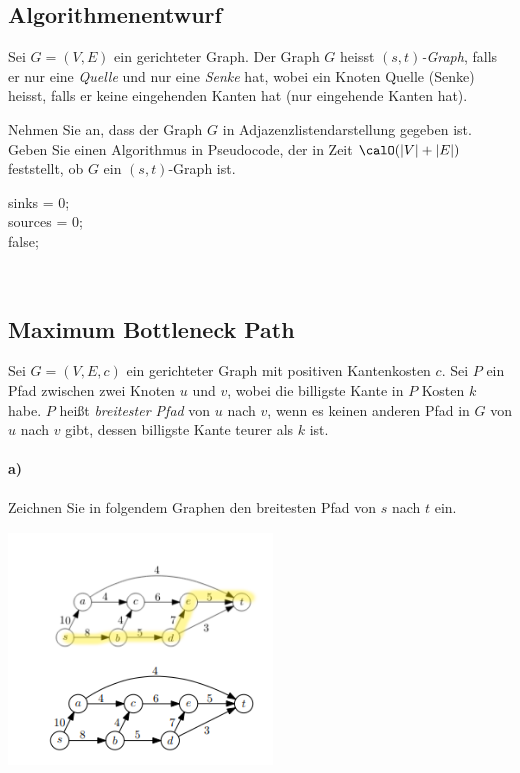 \documentclass[paper=a4, fontsize=11pt]{scrartcl}
\numberwithin{equation}{section}
\numberwithin{figure}{section}
\numberwithin{table}{section}
\begin{document}
\subsection{Algorithmenentwurf}
Sei $G = (V,E)$ ein gerichteter Graph. Der Graph $G$ heisst \emph{$(s,t)$-Graph}, falls er nur eine \emph{Quelle} und nur eine \emph{Senke} hat, wobei ein Knoten Quelle (Senke) heisst, falls er keine eingehenden Kanten hat (nur eingehende Kanten hat).

\medskip\noindent
Nehmen Sie an, dass der Graph $G$ in Adjazenzlistendarstellung gegeben ist.
Geben Sie einen Algorithmus in Pseudocode, der in Zeit $\calO(|V| + |E|)$ feststellt, ob $G$ ein $(s,t)$-Graph ist. \\

\begin{algorithm}[H]
\SetAlgoLined
{}
sinks = 0; \\
sources = 0; \\
\Return false;
\end{algorithm} \\

\subsection{Maximum Bottleneck Path}
Sei $G=(V,E,c)$ ein gerichteter Graph mit positiven Kantenkosten $c$. Sei $P$ ein Pfad zwischen zwei Knoten $u$ und $v$, wobei die billigste Kante in $P$ Kosten $k$ habe. $P$ heißt \emph{breitester Pfad} von $u$ nach $v$, wenn es keinen anderen Pfad in $G$ von $u$ nach $v$ gibt, dessen billigste Kante teurer als $k$ ist.

\paragraph{a)}
Zeichnen Sie in folgendem Graphen den breitesten Pfad von $s$ nach $t$ ein. \\

\includegraphics[width=7cm,height=7cm]{graph112.png} \\
\end{document}
